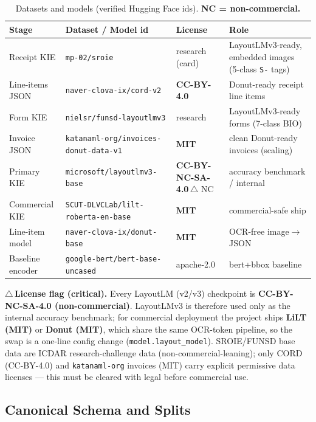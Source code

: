 \documentclass[12pt,a4paper]{article}
\begin{document}
\begin{table}[H]
\centering
\caption{Datasets and models (verified Hugging Face ids). \textbf{NC = non-commercial.}}
\small
\begin{tabularx}{\linewidth}{@{} l l l L @{}}
\toprule
\textbf{Stage} & \textbf{Dataset / Model id} & \textbf{License} & \textbf{Role} \\
\midrule
Receipt KIE     & \texttt{mp-02/sroie}                        & research (card) & LayoutLMv3-ready, embedded images (5-class \texttt{S-} tags) \\
Line-items JSON & \texttt{naver-clova-ix/cord-v2}             & \textbf{CC-BY-4.0} & Donut-ready receipt line items \\
Form KIE        & \texttt{nielsr/funsd-layoutlmv3}            & research & LayoutLMv3-ready forms (7-class BIO) \\
Invoice JSON    & \texttt{katanaml-org/invoices-donut-data-v1}& \textbf{MIT} & clean Donut-ready invoices (scaling) \\
\midrule
Primary KIE     & \texttt{microsoft/layoutlmv3-base}          & \textbf{CC-BY-NC-SA-4.0}\,$\triangle$ NC & accuracy benchmark / internal \\
Commercial KIE  & \texttt{SCUT-DLVCLab/lilt-roberta-en-base}  & \textbf{MIT} & commercial-safe ship \\
Line-item model & \texttt{naver-clova-ix/donut-base}          & \textbf{MIT} & OCR-free image$\to$JSON \\
Baseline encoder& \texttt{google-bert/bert-base-uncased}      & apache-2.0 & bert+bbox baseline \\
\bottomrule
\end{tabularx}
\end{table}

\noindent$\triangle$\,\textbf{License flag (critical).} Every LayoutLM (v2/v3)
checkpoint is \textbf{CC-BY-NC-SA-4.0 (non-commercial)}. LayoutLMv3 is therefore used
only as the internal accuracy benchmark; for commercial deployment the project ships
\textbf{LiLT (MIT)} or \textbf{Donut (MIT)}, which share the same OCR-token pipeline, so
the swap is a one-line config change (\texttt{model.layout\_model}). SROIE/FUNSD base
data are ICDAR research-challenge data (non-commercial-leaning); only CORD (CC-BY-4.0)
and \texttt{katanaml-org} invoices (MIT) carry explicit permissive data licenses ---
this must be cleared with legal before commercial use.

\subsection{Canonical Schema and Splits}
\end{document}
